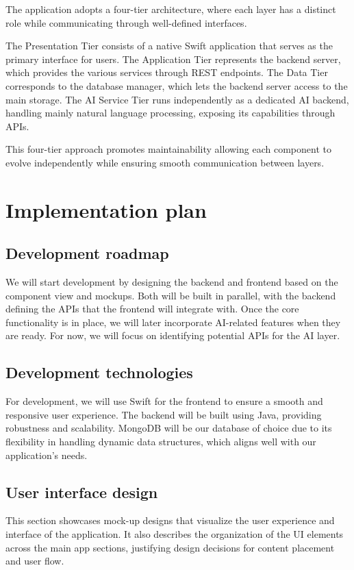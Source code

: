 \documentclass{article}
\begin{document}
The application adopts a four-tier architecture, where each layer has a distinct role while communicating through well-defined interfaces.

The Presentation Tier consists of a native Swift application that serves as the primary interface for users.
The Application Tier represents the backend server, which provides the various services through REST endpoints.
The Data Tier corresponds to the database manager, which lets the backend server access to the main storage.
The AI Service Tier runs independently as a dedicated AI backend, handling mainly natural language processing, exposing its capabilities through APIs.

This four-tier approach promotes maintainability allowing each component to evolve independently while ensuring smooth communication between layers.

\section{Implementation plan}

\subsection{Development roadmap}

We will start development by designing the backend and frontend based on the component view and mockups. 
Both will be built in parallel, with the backend defining the APIs that the frontend will integrate with. Once the core functionality is in place, we will later incorporate AI-related features when they are ready. 
For now, we will focus on identifying potential APIs for the AI layer.

\subsection{Development technologies}

For development, we will use Swift for the frontend to ensure a smooth and responsive user experience. The backend will be built using Java, providing robustness and scalability. 
MongoDB will be our database of choice due to its flexibility in handling dynamic data structures, which aligns well with our application's needs.
\subsection{User interface design}

This section showcases mock-up designs that visualize the user experience and interface of the application.
It also describes the organization of the UI elements across the main app sections, justifying design decisions for content placement and user flow.
\end{document}
